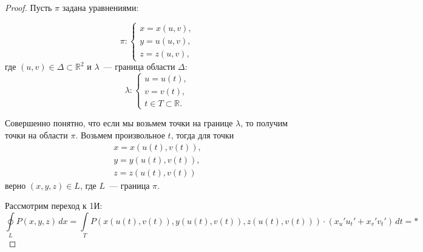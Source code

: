 \documentclass[../../main.tex]{subfiles}
\begin{document}
		\begin{proof}
			Пусть $\pi$ задана уравнениями:
			
			\[ \pi : \begin{cases} 
			x = x\left( u,v\right), \\ 
			y = u\left( u,v\right), \\ 
			z = z\left( u,v\right),  
			\end{cases} \]
			где $\left( u,v \right) \in \Delta \subset \mathbb{R}^2$ и $\lambda$~--- граница области $\Delta$:
			\[ \lambda : \begin{cases} 
			u = u \left( t \right),  \\ 
			v = v \left( t \right), \\ 
			t \in T \subset \mathbb{R}.  
			\end{cases} \]
			
			Совершенно понятно, что если мы возьмем точки на границе $\lambda$, то получим точки на области $\pi$. Возьмем произвольное $t$, тогда для точки
			 \begin{gather*} x = x( u( t), v( t)   ), \\
			 y = y( u( t), v( t)   ), \\
			 z = z( u( t), v( t)   )
			 \end{gather*}
			 верно $(x, y, z) \in L$, где $L$~--- граница $\pi$.
			 
			 Рассмотрим переход к 1И:
			 \[ \oint \limits_L P( x,y,z ) \, dx = \int \limits_T P ( x( u( t), v( t)   ), y( u( t), v( t)   )  ,z( u( t), v( t)   ) ) \cdot ( x_u' u_t' + x_v' v_t' ) \, dt = *  \]
			 

\end{proof}
\end{document}
